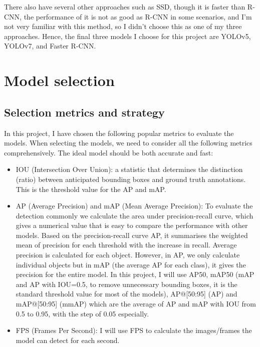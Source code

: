 \documentclass[runningheads]{llncs}
\begin{document}
There also have several other approaches such as SSD, though it is faster than R-CNN, the performance of it is not as good as R-CNN in some scenarios, and I'm not very familiar with this method, so I didn't choose this as one of my three approaches. Hence, the final three models I choose for this project are YOLOv5, YOLOv7, and Faster R-CNN.

\section{Model selection}
\subsection{Selection metrics and strategy}
In this project, I have chosen the following popular metrics to evaluate the models. When selecting the models, we need to consider all the following metrics comprehensively. The ideal model should be both accurate and fast:
\begin{itemize}
  \item IOU (Intersection Over Union): a statistic that determines the distinction (ratio) between anticipated bounding boxes and ground truth annotations. This is the threshold value for the AP and mAP.
  \item AP (Average Precision) and mAP (Mean Average Precision): To evaluate the detection commonly we calculate the area under precision-recall curve, which gives a numerical value that is easy to compare the performance with other models. Based on the precision-recall curve AP, it summarises the weighted mean of precision for each threshold with the increase in recall. Average precision is calculated for each object. However, in AP, we only calculate individual objects but in mAP (the average AP for each class), it gives the precision for the entire model. In this project, I will use AP50, mAP50 (mAP and AP with IOU=0.5, to remove unnecessary bounding boxes, it is the standard threshold value for most of the models), AP@[50:95] (AP) and mAP@[50:95] (mmAP) which are the average of AP and mAP with IOU from 0.5 to 0.95, with the step of 0.05 especially.
  \item FPS (Frames Per Second): I will use FPS to calculate the images/frames the model can detect for each second.
\end{itemize}
\end{document}
